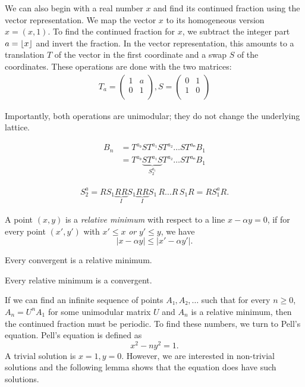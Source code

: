 We can also begin with a real number $x$ and find its continued fraction using
the vector representation.
We map the vector $x$ to its homogeneous version $\hat x = (x, 1)$.
To find the continued fraction for $x$,
we subtract the integer part $a = \lfloor x\rfloor$ and invert the fraction.
In the vector representation, this amounts to a translation $T$ of the vector in
the first coordinate and a swap $S$ of the coordinates.
These operations are done with the two matrices:
\begin{align*}
  T_a = \begin{pmatrix}
    1 & a \\
    0 & 1 \\
  \end{pmatrix},
  S = \begin{pmatrix}
    0 & 1 \\
    1 & 0 \\
  \end{pmatrix}
\end{align*}

Importantly, both operations are unimodular; they do not change the underlying lattice.

\begin{align*}
  B_n & = T^{a₀} S T^{a₁} S T^{a₂} … S T^{aₙ} B_1 \\
  & = T^{a₀} \underbrace{S T^{a₁} S}_{S_2^{a_1}} T^{a₂} … S T^{aₙ} B_1
\end{align*}

\begin{align*}
  S_2^a = R S_1 \underbrace{R R}_{I} S_1 \underbrace{R R}_I S_1\, R … R\, S_1 R = R S_1^{a} R.
\end{align*}

\begin{definition}
  A point $(x, y)$ is a \emph{relative minimum} with respect to a line $x - α y = 0$,
  if for every point $(x', y')$ with $x' ≤ x$ \emph{or} $y' ≤ y$, we have
  \[
    |x - α y| ≤ |x' - α y'|.
  \]
\end{definition}

\begin{lemma}
  Every convergent is a relative minimum.
\end{lemma}

\begin{lemma}
  Every relative minimum is a convergent.
\end{lemma}

If we can find an infinite sequence of points $A₁, A₂, …$
such that for every $n ≥ 0$, $A_n = U^n A_1$ for some unimodular matrix $U$
and $A_n$ is a relative minimum,
then the continued fraction must be periodic.
To find these numbers, we turn to Pell's equation.
Pell's equation is defined as
\[
  x^2 - n y^2 = 1.
\]
A trivial solution is $x = 1, y = 0$.
However, we are interested in non-trivial solutions and the following lemma
shows that the equation does have such solutions.

